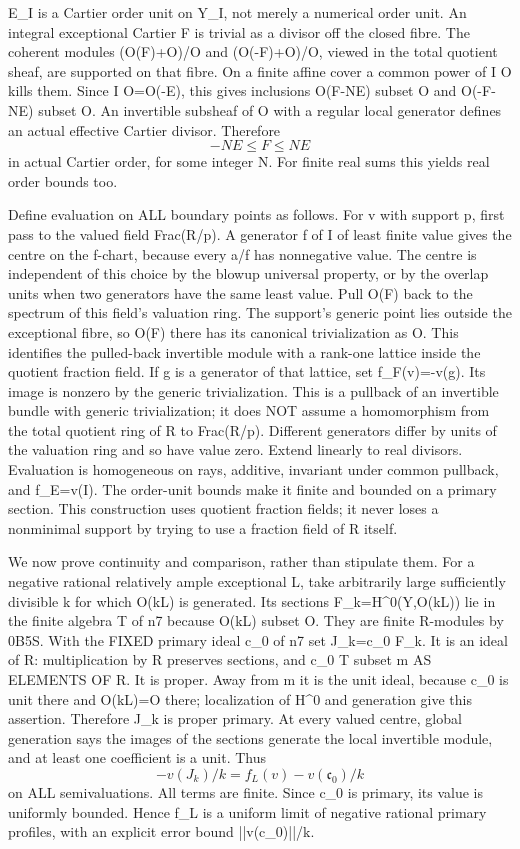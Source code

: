 \documentclass[11pt]{article}
\begin{document}
E\_I is a Cartier order unit on Y\_I, not merely a numerical order unit. An integral exceptional Cartier F is trivial as a divisor off the closed fibre. The coherent modules (O(F)+O)/O and (O(-F)+O)/O, viewed in the total quotient sheaf, are supported on that fibre. On a finite affine cover a common power of I O kills them. Since I O=O(-E), this gives inclusions O(F-NE) subset O and O(-F-NE) subset O. An invertible subsheaf of O with a regular local generator defines an actual effective Cartier divisor. Therefore
\[
-NE\le F\le NE
\]
in actual Cartier order, for some integer N. For finite real sums this yields real order bounds too.

Define evaluation on ALL boundary points as follows. For v with support p, first pass to the valued field Frac(R/p). A generator f of I of least finite value gives the centre on the f-chart, because every a/f has nonnegative value. The centre is independent of this choice by the blowup universal property, or by the overlap units when two generators have the same least value. Pull O(F) back to the spectrum of this field's valuation ring. The support's generic point lies outside the exceptional fibre, so O(F) there has its canonical trivialization as O. This identifies the pulled-back invertible module with a rank-one lattice inside the quotient fraction field. If g is a generator of that lattice, set f\_F(v)=-v(g). Its image is nonzero by the generic trivialization. This is a pullback of an invertible bundle with generic trivialization; it does NOT assume a homomorphism from the total quotient ring of R to Frac(R/p). Different generators differ by units of the valuation ring and so have value zero. Extend linearly to real divisors. Evaluation is homogeneous on rays, additive, invariant under common pullback, and f\_E=v(I). The order-unit bounds make it finite and bounded on a primary section. This construction uses quotient fraction fields; it never loses a nonminimal support by trying to use a fraction field of R itself.

We now prove continuity and comparison, rather than stipulate them. For a negative rational relatively ample exceptional L, take arbitrarily large sufficiently divisible k for which O(kL) is generated. Its sections F\_k=H\textasciicircum{}0(Y,O(kL)) lie in the finite algebra T of n7 because O(kL) subset O. They are finite R-modules by 0B5S. With the FIXED primary ideal c\_0 of n7 set J\_k=c\_0 F\_k. It is an ideal of R: multiplication by R preserves sections, and c\_0 T subset m AS ELEMENTS OF R. It is proper. Away from m it is the unit ideal, because c\_0 is unit there and O(kL)=O there; localization of H\textasciicircum{}0 and generation give this assertion. Therefore J\_k is proper primary. At every valued centre, global generation says the images of the sections generate the local invertible module, and at least one coefficient is a unit. Thus
\[
-v(J_k)/k=f_L(v)-v(\mathfrak c_0)/k
\]
on ALL semivaluations. All terms are finite. Since c\_0 is primary, its value is uniformly bounded. Hence f\_L is a uniform limit of negative rational primary profiles, with an explicit error bound ||v(c\_0)||/k.
\end{document}
